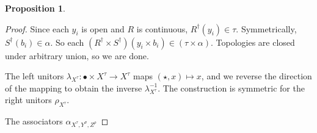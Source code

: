 \documentclass{tufte-handout}
\theoremstyle{definition}
\newtheorem{proposition}[theorem]{Proposition}
\begin{document}
\begin{proposition}
\begin{proof}
Since each $y_i$ is open and $R$ is continuous, $R^\dag(y_i) \in \tau$. Symmetrically, $S^\dag(b_i) \in \alpha$. So each $(R^\dag \times S^\dag)(y_i \times b_i) \in (\tau \times \alpha)$. Topologies are closed under arbitrary union, so we are done.

 The left unitors $\lambda_{X^{\tau}}: \bullet \times X^\tau \rightarrow X^\tau$ maps $(\star,x) \mapsto x$, and we reverse the direction of the mapping to obtain the inverse $\lambda^{-1}_{X^{\tau}}$. The construction is symmetric for the right unitors $\rho_{X^{\tau}}$. 


The associators $\alpha_{X^{\tau},Y^{\sigma},Z^{\rho}}$






\end{proof}
\end{proposition}
\end{document}
